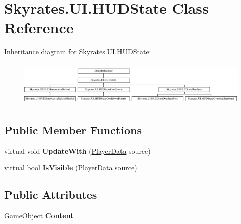 \hypertarget{class_skyrates_1_1_u_i_1_1_h_u_d_state}{\section{Skyrates.\-U\-I.\-H\-U\-D\-State Class Reference}
\label{class_skyrates_1_1_u_i_1_1_h_u_d_state}
}
Inheritance diagram for Skyrates.\-U\-I.\-H\-U\-D\-State\-:\begin{figure}[H]
\begin{center}
\leavevmode
\includegraphics[height=2.196079cm]{class_skyrates_1_1_u_i_1_1_h_u_d_state}
\end{center}
\end{figure}
\subsection*{Public Member Functions}
\begin{DoxyCompactItemize}
\item 
\hypertarget{class_skyrates_1_1_u_i_1_1_h_u_d_state_ab94852976cece39a5a06ed3057e0b4d9}{virtual void {\bfseries Update\-With} (\hyperlink{class_skyrates_1_1_data_1_1_player_data}{Player\-Data} source)}\label{class_skyrates_1_1_u_i_1_1_h_u_d_state_ab94852976cece39a5a06ed3057e0b4d9}

\item 
\hypertarget{class_skyrates_1_1_u_i_1_1_h_u_d_state_a50d0c81e4b4377969feec1effc003dc0}{virtual bool {\bfseries Is\-Visible} (\hyperlink{class_skyrates_1_1_data_1_1_player_data}{Player\-Data} source)}\label{class_skyrates_1_1_u_i_1_1_h_u_d_state_a50d0c81e4b4377969feec1effc003dc0}

\end{DoxyCompactItemize}
\subsection*{Public Attributes}
\begin{DoxyCompactItemize}
\item 
\hypertarget{class_skyrates_1_1_u_i_1_1_h_u_d_state_a4aadc53bb639e3b94621dc827d54caf9}{Game\-Object {\bfseries Content}}\label{class_skyrates_1_1_u_i_1_1_h_u_d_state_a4aadc53bb639e3b94621dc827d54caf9}

\end{DoxyCompactItemize}
